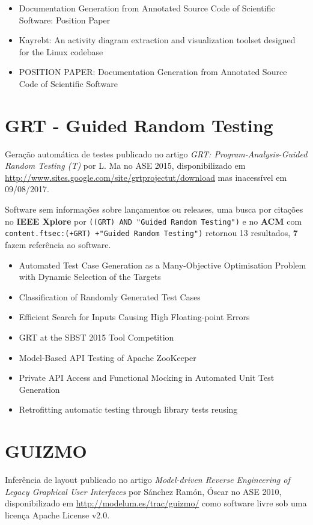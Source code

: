 \begin{itemize}
\item Documentation Generation from Annotated Source Code of Scientific Software: Position Paper
\item Kayrebt: An activity diagram extraction and visualization toolset designed for the Linux codebase
\item POSITION PAPER: Documentation Generation from Annotated Source Code of Scientific Software
\end{itemize}


\section{GRT - Guided Random Testing}

Geração automática de testes
publicado no artigo {\it GRT: Program-Analysis-Guided Random Testing (T)}
por L. Ma
no ASE 2015,
disponibilizado em \url{http://www.sites.google.com/site/grtprojectut/download}
mas inacessível em 09/08/2017.

Software sem informações sobre lançamentos ou releases,
uma busca por citações no {\bf IEEE Xplore} por
\texttt{((GRT) AND "Guided Random Testing")}
e no {\bf ACM} com
\texttt{content.ftsec:(+GRT) +"Guided Random Testing")}
retornou
13 resultados,
{\bf 7} fazem referência ao software.

\begin{itemize}
\item Automated Test Case Generation as a Many-Objective Optimisation Problem with Dynamic Selection of the Targets
\item Classification of Randomly Generated Test Cases
\item Efficient Search for Inputs Causing High Floating-point Errors
\item GRT at the SBST 2015 Tool Competition
\item Model-Based API Testing of Apache ZooKeeper
\item Private API Access and Functional Mocking in Automated Unit Test Generation
\item Retrofitting automatic testing through library tests reusing
\end{itemize}


\section{GUIZMO}

Inferência de layout
publicado no artigo {\it Model-driven Reverse Engineering of Legacy Graphical User Interfaces}
por S\'{a}nchez Ram\'{o}n, \'{O}scar
no ASE 2010,
disponibilizado em \url{http://modelum.es/trac/guizmo/}
como software livre
sob uma licença Apache License v2.0.

